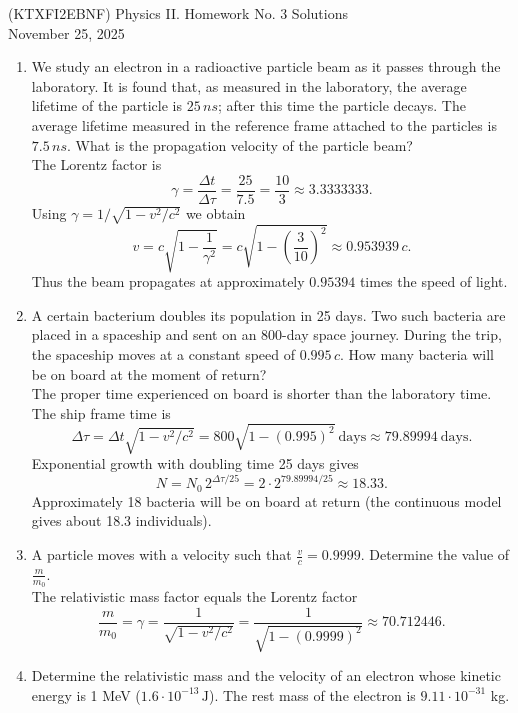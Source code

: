 \documentclass[a4paper,12pt]{letter}
\begin{document}
\begin{center}
(KTXFI2EBNF) Physics II. Homework No. 3 Solutions\\
November 25, 2025
\end{center}

\begin{enumerate}

\item We study an electron in a radioactive particle beam as it passes through the laboratory. It is found that, as measured in the laboratory, the average lifetime of the particle is $25\,ns$; after this time the particle decays. The average lifetime measured in the reference frame attached to the particles is $7.5\,ns$. What is the propagation velocity of the particle beam?\\

The Lorentz factor is
$$ \gamma = \frac{\Delta t}{\Delta \tau} = \frac{25}{7.5} = \frac{10}{3} \approx 3.3333333. $$
Using $\gamma = 1/\sqrt{1 - v^2/c^2}$ we obtain
$$ v = c\sqrt{1 - \frac{1}{\gamma^2}} = c\sqrt{1 - \left(\frac{3}{10}\right)^2} \approx 0.953939\,c. $$
Thus the beam propagates at approximately $0.95394$ times the speed of light.

\item A certain bacterium doubles its population in 25 days. Two such bacteria are placed in a spaceship and sent on an 800-day space journey. During the trip, the spaceship moves at a constant speed of $0.995\,c$. How many bacteria will be on board at the moment of return?\\

The proper time experienced on board is shorter than the laboratory time. The ship frame time is
$$ \Delta \tau = \Delta t\sqrt{1 - v^2/c^2} = 800\sqrt{1 - (0.995)^2}\ \text{days} \approx 79.89994\ \text{days}. $$
Exponential growth with doubling time 25 days gives
$$ N = N_0 \, 2^{\Delta \tau / 25} = 2 \cdot 2^{79.89994/25} \approx 18.33. $$
Approximately 18 bacteria will be on board at return (the continuous model gives about 18.3 individuals).

\item A particle moves with a velocity such that $\frac{v}{c} = 0.9999$. Determine the value of $\frac{m}{m_{0}}$.\\

The relativistic mass factor equals the Lorentz factor
$$ \frac{m}{m_0} = \gamma = \frac{1}{\sqrt{1 - v^2/c^2}} = \frac{1}{\sqrt{1 - (0.9999)^2}} \approx 70.712446. $$

\item Determine the relativistic mass and the velocity of an electron whose kinetic energy is 1 MeV ($ 1.6 \cdot 10^{-13} \, \text{J} $). The rest mass of the electron is $9.11 \cdot 10^{-31}$ kg.\\


\end{enumerate}
\end{document}
